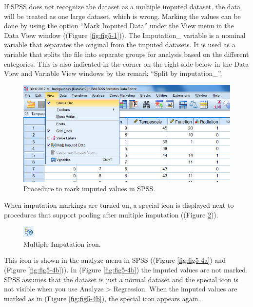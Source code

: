 \documentclass[]{book}
\theoremstyle{definition}
\theoremstyle{definition}
\theoremstyle{definition}
\theoremstyle{remark}
\begin{document}
If SPSS does not recognize the dataset as a multiple imputed dataset,
the data will be treated as one large dataset, which is wrong. Marking
the values can be done by using the option ``Mark Imputed Data'' under
the View menu in the Data View window ((Figure \ref{fig:fig5-1})). The
Imputation\_ variable is a nominal variable that separates the original
from the imputed datasets. It is used as a variable that splits the file
into separate groups for analysis based on the different categories.
This is also indicated in the corner on the right side below in the Data
View and Variable View windows by the remark ``Split by imputation\_''.

\begin{figure}

{\centering \includegraphics[width=0.9\linewidth]{images/fig5.2} 

}

\caption{Procedure to mark imputed values in SPSS.}\label{fig:fig5-2}
\end{figure}

When imputation markings are turned on, a special icon is displayed next
to procedures that support pooling after multiple imputation ((Figure
\ref{fig:fig5-3})).

\begin{figure}

{\centering \includegraphics[width=0.05\linewidth]{images/fig5.3} 

}

\caption{Multiple Imputation icon.}\label{fig:fig5-3}
\end{figure}

This icon is shown in the analyze menu in SPSS ((Figure
\ref{fig:fig5-4a}) and (Figure \ref{fig:fig5-4b})). In (Figure
\ref{fig:fig5-4b}) the imputed values are not marked. SPSS assumes that
the dataset is just a normal dataset and the special icon is not visible
when you use Analyze \textgreater{} Regression. When the imputed values
are marked as in (Figure \ref{fig:fig5-4b}), the special icon appears
again.
\end{document}
